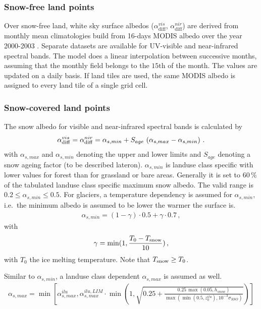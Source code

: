 \documentclass[a4paper,11pt]{article}
\begin{document}
\subsubsection{Snow-free land points}
Over snow-free land, white sky surface albedos ($\alpha_{\mathrm{diff}}^{vis}$, $\alpha_{\mathrm{diff}}^{nir}$) are derived from monthly mean climatologies build from 16-days MODIS 
albedo over the year 2000-2003 \citep{Schaaf:2002}. Separate datasets are available for UV-visible and near-infrared spectral bands. The model does a linear interpolation between 
successive months, assuming that the monthly field belongs to the $15\mathrm{th}$ of the month. The values are updated on a daily basis. If land tiles are used, the same MODIS albedo 
is assigned to every land tile of a single grid cell.


\subsubsection{Snow-covered land points}
The snow albedo for visible and near-infrared spectral bands is calculated by
\begin{align}
 \alpha_{\rm diff}^{vis} = \alpha_{\rm diff}^{nir} =\alpha_{s,min} + S_{age}\,\left(\alpha_{s,max} - \alpha_{s,min}\right)\,.
\end{align}
with $\alpha_{s,max}$ and $\alpha_{s,min}$ denoting the upper and lower limits and $S_{age}$ denoting a snow ageing factor (to be described lateron). 
$\alpha_{s,min}$ is landuse class specific with lower values for forest than for grassland or bare areas. Generally it is set to $60\,\mathrm{\%}$ 
of the tabulated landuse class specific maximum snow albedo. The valid range is $0.2\leq \alpha_{s,min} \leq 0.5$. For glaciers, a temperature dependency 
is assumed for $\alpha_{s,min}$, i.e.\ the minimum albedo is assumed to be lower the warmer the surface is. 
\begin{align}
 \alpha_{s,min} = (1-\gamma) \cdot 0.5 + \gamma \cdot 0.7\, ,
\end{align}
with
\begin{align}
 \gamma = \min(1, \frac{T_{0} - T_{\rm snow}}{10})\,,
\end{align}
with $T_{0}$ the ice melting temperature. Note that $T_{\rm snow}\ge T_{0}$.

Similar to $\alpha_{s,min}$, a landuse class dependent $\alpha_{s,max}$ is assumed as well.
\begin{align}
 \alpha_{s,max} = \min\left[\alpha_{s,max}^{ilu},\alpha_{s,max}^{ilu,LIM}\cdot \min\left(1,\sqrt{0.25+\frac{0.25\,\max(0.05,h_{snow})}{\max(\min(0.5,z_{0}^{ilu}),10^{-3} \sigma_{SSO})}}\right)\right]\label{eq:alpha_max}
\end{align}
\end{document}
